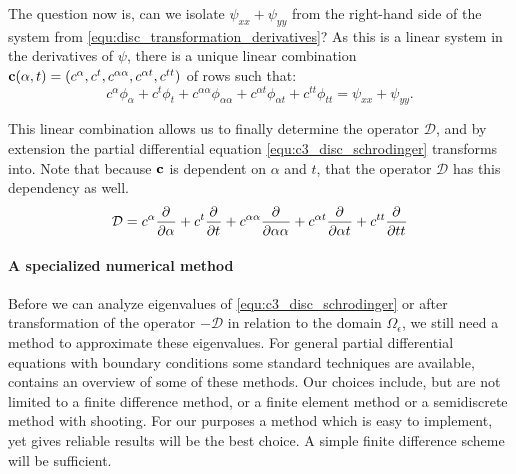 The question now is, can we isolate $\psi_{xx} + \psi_{yy}$ from the right-hand side of the system from \eqref{equ:disc_transformation_derivatives}? As this is a linear system in the derivatives of $\psi$, there is a unique linear combination $\vb{c}(\alpha, t) = (c^\alpha, c^t, c^{\alpha\alpha}, c^{\alpha t}, c^{tt})$ of rows such that:
$$
    c^\alpha \phi_\alpha + c^t\phi_t + c^{\alpha\alpha}\phi_{\alpha\alpha} + c^{\alpha t} \phi_{\alpha t} + c^{tt} \phi_{tt} = \psi_{xx} + \psi_{yy}\text{.}
$$

This linear combination allows us to finally determine the operator $\mathcal{D}$, and by extension the partial differential equation \eqref{equ:c3_disc_schrodinger} transforms into. Note that because $\vb{c}$ is dependent on $\alpha$ and $t$, that the operator $\mathcal{D}$ has this dependency as well.
$$
    \mathcal{D} = c^\alpha {\pdv[]{}{\alpha}} + c^t \pdv[]{}{t} + c^{\alpha\alpha} \pdv[]{}{\alpha\alpha} + c^{\alpha t} \pdv[]{}{\alpha t} + c^{tt} \pdv[]{}{tt}
$$

\paragraph{A specialized numerical method}

Before we can analyze eigenvalues of \eqref{equ:c3_disc_schrodinger} or after transformation of the operator $-\mathcal{D}$ in relation to the domain $\Omega_\epsilon$, we still need a method to approximate these eigenvalues. For general partial differential equations with boundary conditions some standard techniques are available, \cite[Chapter~11]{heath_scientific_2002} contains an overview of some of these methods. Our choices include, but are not limited to a finite difference method, or a finite element method or a semidiscrete method with shooting. For our purposes a method which is easy to implement, yet gives reliable results will be the best choice. A simple finite difference scheme will be sufficient.

